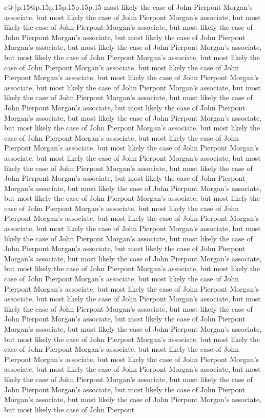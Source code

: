 \documentclass{article}
\begin{document}
{\begin{supertabular}{c@{$\;$}|p{.15\linewidth}@{}p{.15\linewidth}p{.15\linewidth}p{.15\linewidth}p{.15\linewidth}p{.15\linewidth}}
{{{most likely the case of John Pierpont Morgan's associate, but most likely the case of John Pierpont Morgan's associate, but most likely the case of John Pierpont Morgan's associate, but most likely the case of John Pierpont Morgan's associate, but most likely the case of John Pierpont Morgan's associate, but most likely the case of John Pierpont Morgan's associate, but most likely the case of John Pierpont Morgan's associate, but most likely the case of John Pierpont Morgan's associate, but most likely the case of John Pierpont Morgan's associate, but most likely the case of John Pierpont Morgan's associate, but most likely the case of John Pierpont Morgan's associate, but most likely the case of John Pierpont Morgan's associate, but most likely the case of John Pierpont Morgan's associate, but most likely the case of John Pierpont Morgan's associate, but most likely the case of John Pierpont Morgan's associate, but most likely the case of John Pierpont Morgan's associate, but most likely the case of John Pierpont Morgan's associate, but most likely the case of John Pierpont Morgan's associate, but most likely the case of John Pierpont Morgan's associate, but most likely the case of John Pierpont Morgan's associate, but most likely the case of John Pierpont Morgan's associate, but most likely the case of John Pierpont Morgan's associate, but most likely the case of John Pierpont Morgan's associate, but most likely the case of John Pierpont Morgan's associate, but most likely the case of John Pierpont Morgan's associate, but most likely the case of John Pierpont Morgan's associate, but most likely the case of John Pierpont Morgan's associate, but most likely the case of John Pierpont Morgan's associate, but most likely the case of John Pierpont Morgan's associate, but most likely the case of John Pierpont Morgan's associate, but most likely the case of John Pierpont Morgan's associate, but most likely the case of John Pierpont Morgan's associate, but most likely the case of John Pierpont Morgan's associate, but most likely the case of John Pierpont Morgan's associate, but most likely the case of John Pierpont Morgan's associate, but most likely the case of John Pierpont Morgan's associate, but most likely the case of John Pierpont Morgan's associate, but most likely the case of John Pierpont Morgan's associate, but most likely the case of John Pierpont Morgan's associate, but most likely the case of John Pierpont Morgan's associate, but most likely the case of John Pierpont Morgan's associate, but most likely the case of John Pierpont Morgan's associate, but most likely the case of John Pierpont Morgan's associate, but most likely the case of John Pierpont Morgan's associate, but most likely the case of John Pierpont Morgan's associate, but most likely the case of John Pierpont Morgan's associate, but most likely the case of John Pierpont Morgan's associate, but most likely the case of John Pierpont Morgan's associate, but most likely the case of John Pierpont Morgan's associate, but most likely the case of John Pierpont Morgan's associate, but most likely the case of John Pierpont Morgan's associate, but most likely the case of John Pierpont }}}
\end{supertabular}}
\end{document}
